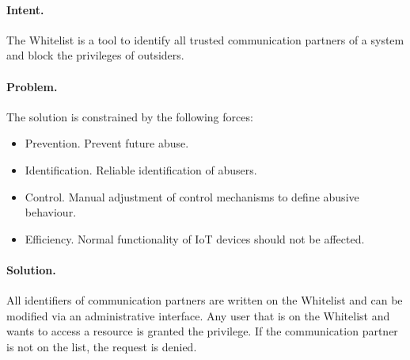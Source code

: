 \paragraph{\textbf{Intent.}} The Whitelist is a tool to identify all trusted communication partners of a system and block the privileges of outsiders.

\paragraph{\textbf{Problem.}} The solution is constrained by the following forces:
\begin{itemize}
	\item Prevention. Prevent future abuse.
	\item Identification. Reliable identification of abusers.
	\item Control. Manual adjustment of control mechanisms to define abusive behaviour.
	\item Efficiency. Normal functionality of IoT devices should not be affected.
\end{itemize}

\paragraph{\textbf{Solution.}} All identifiers of communication partners are written on the Whitelist and can be modified via an administrative interface. Any user that is on the Whitelist and wants to access a resource is granted the privilege. If the communication partner is not on the list, the request is denied.
